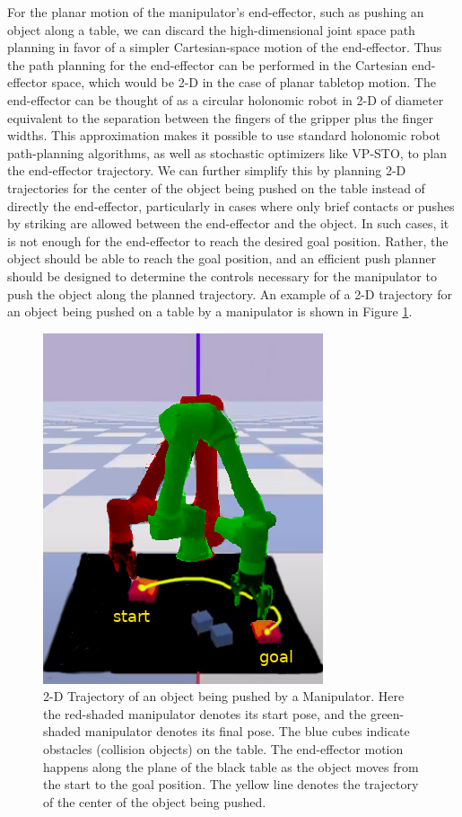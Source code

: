 For the planar motion of the manipulator's end-effector, such as pushing an object along a table, we can discard the high-dimensional joint space path planning in favor of a simpler Cartesian-space motion of the end-effector. Thus the path planning for the end-effector can be performed in the Cartesian end-effector space, which would be 2-D in the case of planar tabletop motion. The end-effector can be thought of as a circular holonomic robot in 2-D of diameter equivalent to the separation between the fingers of the gripper plus the finger widths. This approximation makes it possible to use standard holonomic robot path-planning algorithms, as well as stochastic optimizers like VP-STO, to plan the end-effector trajectory. We can further simplify this by planning 2-D trajectories for the center of the object being pushed on the table instead of directly the end-effector, particularly in cases where only brief contacts or pushes by striking are allowed between the end-effector and the object. In such cases, it is not enough for the end-effector to reach the desired goal position. Rather, the object should be able to reach the goal position, and an efficient push planner should be designed to determine the controls necessary for the manipulator to push the object along the planned trajectory. An example of a 2-D trajectory for an object being pushed on a table by a manipulator is shown in Figure \ref{fig:end-eff-traj}.

\begin{figure}[ht]
    \centering
    \includegraphics[scale=0.5]{figures/bl-manipulator/end_eff_traj.png}
    \caption[2-D Trajectory of an object being pushed by a Manipulator]{2-D Trajectory of an object being pushed by a Manipulator. Here the red-shaded manipulator denotes its start pose, and the green-shaded manipulator denotes its final pose. The blue cubes indicate obstacles (collision objects) on the table. The end-effector motion happens along the plane of the black table as the object moves from the start to the goal position. The yellow line denotes the trajectory of the center of the object being pushed.}
    \label{fig:end-eff-traj}
\end{figure}

